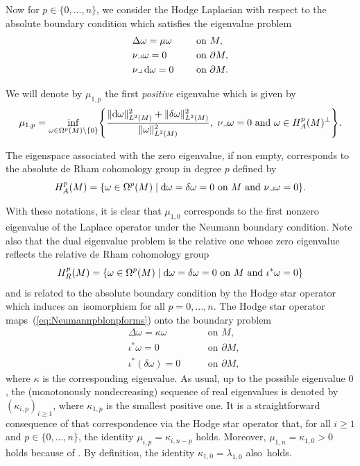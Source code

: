 \documentclass[10pt,a4paper]{amsart}
\numberwithin{equation}{section}
\theoremstyle{definition}
\begin{document}
Now for $p\in\{0,\dots,n\}$, we consider the Hodge Laplacian with respect to the absolute boundary condition which satisfies the eigenvalue problem
\begin{equation}\label{eq:Neumannpblonpforms}
\begin{aligned}
&\Delta \omega =\mu \omega\ \quad &&\textrm{on } M, \\
&\nu\lrcorner\omega =0\ \quad&&\textrm{on }\partial M, \\
&\nu\lrcorner\,{\rm d}\omega = 0\ \quad &&\textrm{on }\partial M.
\end{aligned}
\end{equation}

We will denote by $\mu_{1,p}$ the first {\it positive} eigenvalue which is given by
\begin{equation}\label{VC_Absolute}
\mu_{1,p}=\inf_{\omega\in\Omega^p(M)\setminus\{0\}}\Biggl\{\frac{\|{\rm d}\omega\|_{L^2(M)}^2+\|\delta\omega\|_{L^2(M)}^2}{\|\omega\|_{L^2(M)}^2},\ \nu\lrcorner\omega=0\textrm{ and }\omega\in H_A^p(M)^\perp\Biggr\}.
\end{equation}

The eigenspace associated with the zero eigenvalue, if non empty, corresponds to the absolute de Rham cohomology group in degree $p$ defined by
\[
H_A^p(M)= \{\omega\in \Omega^p(M)\mid {\rm d}\omega=\delta\omega=0\ \text{on}\ M\text{ and } \nu\lrcorner\omega=0 \}.
\]

With these notations, it is clear that $\mu_{1,0}$ corresponds to the first nonzero eigenvalue of the Laplace operator under the Neumann boundary condition. Note also that the dual eigenvalue problem is the relative one whose zero eigenvalue reflects the relative de Rham cohomology group
\[
 H_R^p(M)= \{\omega\in \Omega^p(M)\mid {\rm d}\omega=\delta\omega=0\ \text{on}\ M\text{ and } \iota^*\omega=0 \}
\]
and is related to the absolute boundary condition by the Hodge star operator which induces an~isomorphism  for all $p=0,\dots,n$.
The Hodge star operator maps~(\ref{eq:Neumannpblonpforms}) onto the boundary problem
\[
\begin{aligned}
&\Delta \omega =\kappa \omega\ \quad &&\textrm{on } M,\\
&\iota^*\omega =0 \ \quad &&\textrm{on }\partial M,\\
&\iota^*(\delta\omega) = 0\ \quad &&\textrm{on }\partial M,
\end{aligned}
\]
where $\kappa$ is the corresponding eigenvalue.
As usual, up to the possible eigenvalue $0$, the (mo\-no\-to\-nous\-ly nondecreasing) sequence of real eigenvalues is denoted by $(\kappa_{i,p})_{i\geq1}$, where $\kappa_{1,p}$ is the smallest positive one.
It is a straightforward consequence of that correspondence via the Hodge star operator that, for all $i\geq1$ and $p\in\{0,\dots,n\}$, the identity $\mu_{i,p}=\kappa_{i,n-p}$ holds.
Moreover, $\mu_{1,n}=\kappa_{1,0}>0$ holds because of . By definition, the identity $\kappa_{1,0}=\lambda_{1,0}$ also~holds.
\end{document}
